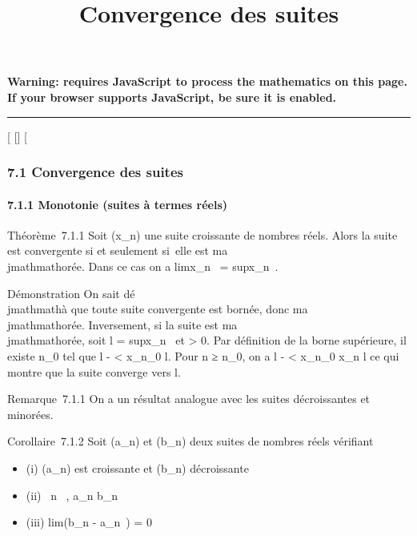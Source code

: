 \documentclass[]{article}
\title{Convergence des suites}
\author{}
\date{}
\begin{document}
\maketitle

\textbf{Warning: 
requires JavaScript to process the mathematics on this page.\\ If your
browser supports JavaScript, be sure it is enabled.}

\begin{center}\rule{3in}{0.4pt}\end{center}

{[}
{[}{]}
{[}

\subsubsection{7.1 Convergence des suites}

\paragraph{7.1.1 Monotonie (suites à termes réels)}

Théorème~7.1.1 Soit (x_n) une suite croissante de nombres
réels. Alors la suite est convergente si et seulement si~elle est
ma\\jmathmathorée. Dans ce cas on a limx_n~
= supx_n~.

Démonstration On sait dé\\jmathmathà que toute suite convergente est bornée, donc
ma\\jmathmathorée. Inversement, si la suite est ma\\jmathmathorée, soit l
= supx_n~ et \epsilon \textgreater{} 0. Par
définition de la borne supérieure, il existe n_0 tel que l - \epsilon
\textless{} x_n_0 \leq l. Pour n ≥ n_0, on a l -
\epsilon \textless{} x_n_0 \leq x_n \leq l ce qui montre
que la suite converge vers l.

Remarque~7.1.1 On a un résultat analogue avec les suites décroissantes
et minorées.

Corollaire~7.1.2 Soit (a_n) et (b_n) deux suites de
nombres réels vérifiant

\begin{itemize}
\itemsep1pt\parskip0pt
\item
  (i) (a_n) est croissante et (b_n) décroissante
\item
  (ii) \forall~n \in {}~, a_n \leq b_n~
\item
  (iii) lim(b_n - a_n~) = 0
\end{itemize}
\end{document}
